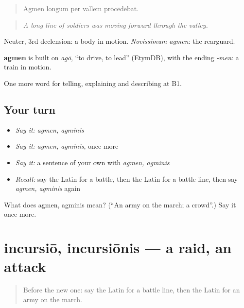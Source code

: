 \begin{quote}
Agmen longum per vallem prōcēdēbat.
\end{quote}

\begin{quote}
\emph{A long line of soldiers was moving forward through the valley.}
\end{quote}

Neuter, 3rd declension: a body in motion. \emph{Novissimum agmen}: the rearguard.

\begin{cousinweb}
\textbf{agmen} is built on \emph{agō}, \textquotedblleft{}to drive, to lead\textquotedblright{} (EtymDB), with the ending \emph{-men}: a train in motion.
\end{cousinweb}

\begin{grammarlens}[title={What you've built}]
One more word for telling, explaining and describing at B1.
\end{grammarlens}

\subsection*{Your turn}
\begin{itemize}
\raggedright
  \item \emph{Say it:} \emph{agmen, agminis}
  \item \emph{Say it:} \emph{agmen, agminis}, once more
  \item \emph{Say it:} a sentence of your own with \emph{agmen, agminis}
  \item \emph{Recall:} say the Latin for a battle, then the Latin for a battle line, then say \emph{agmen, agminis} again
\end{itemize}

\begin{tcolorbox}[breakable,colback=teal!4,colframe=teal!35!black,title={Before you move on}]
What does agmen, agminis mean? (\textquotedblleft{}An army on the march; a crowd\textquotedblright{}.) Say it once more.
\end{tcolorbox}
\section[incursiō, incursiōnis]{incursiō, incursiōnis — a raid, an attack}

\label{lesson:LA-C339-incursio}



\begin{quote}
Before the new one: say the Latin for a battle line, then the Latin for an army on the march.
\end{quote}

